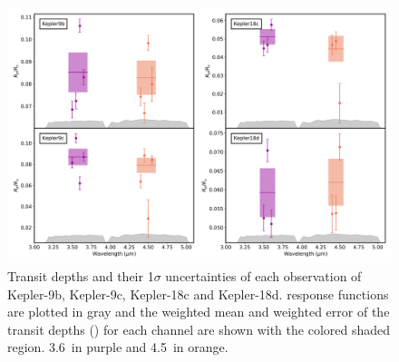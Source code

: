 \begin{subappendices}
\begin{figure}
    \centering
    \includegraphics[width =\linewidth]{TransitDepths.pdf}
    \caption{Transit depths and their 1$\sigma$ uncertainties of each observation of Kepler-9b, Kepler-9c, Kepler-18c and Kepler-18d. \spitzer response functions are plotted in gray and the weighted mean and weighted error of the transit depths (\rprss) for each channel are shown with the colored shaded region. 3.6\um~in purple and 4.5\um~in orange.}
    \label{P4:fig:TD}
\end{figure}


\end{subappendices}

